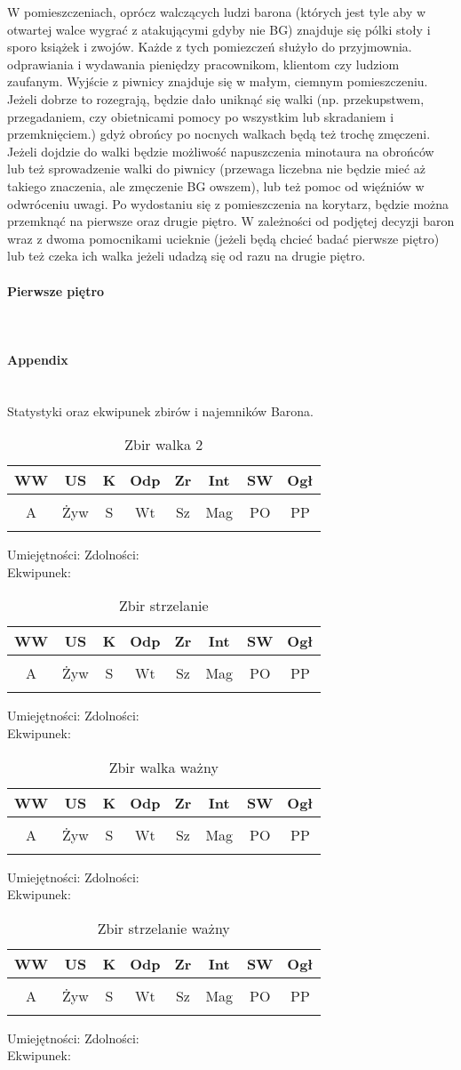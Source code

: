 \documentclass{article}
\newcommand{\whtable}[1]{
    \begin{table}[h]
        \caption{{#1}}
        \vspace{4pt}
        \centering
            \begin{tabular}{|c|c|c|c|c|c|c|c|}
                \hline
                WW & US & K & Odp & Zr & Int & SW & Ogł \\ \hline
                 &  &  &  &  &  &  &  \\ \hline
                A & Żyw & S & Wt & Sz & Mag & PO & PP \\ \hline
                 &  &  &  &  &  &  &  \\ \hline
                \end{tabular}
    \end{table}

    \noindent
    Umiejętności:
    \hspace{150pt}
    Zdolności:
    \vspace{50pt}\\
    Ekwipunek:
    \vspace{50pt}
}
\begin{document}
W pomieszczeniach, oprócz walczących ludzi barona (których jest tyle aby w otwartej walce wygrać z atakującymi gdyby nie BG) znajduje się pólki stoły i sporo książek i zwojów. Każde z tych pomiezczeń służyło do przyjmownia. odprawiania i wydawania pieniędzy pracownikom, klientom czy ludziom zaufanym. Wyjście z piwnicy znajduje się w małym, ciemnym pomieszczeniu. Jeżeli dobrze to rozegrają, będzie dało uniknąć się walki (np. przekupstwem, przegadaniem, czy obietnicami pomocy po wszystkim lub skradaniem i przemknięciem.) gdyż obrońcy po nocnych walkach będą też trochę zmęczeni. Jeżeli dojdzie do walki będzie możliwość napuszczenia minotaura na obrońców lub też sprowadzenie walki do piwnicy (przewaga liczebna nie będzie mieć aż takiego znaczenia, ale zmęczenie BG owszem), lub też pomoc od więźniów w odwróceniu uwagi. Po wydostaniu się z pomieszczenia na korytarz, będzie można przemknąć na pierwsze oraz drugie piętro. W zależności od podjętej decyzji baron wraz z dwoma pomocnikami ucieknie (jeżeli będą chcieć badać pierwsze piętro) lub też czeka ich walka jeżeli udadzą się od razu na drugie piętro. 

\paragraph{\Large{Pierwsze piętro}}\mbox{}\\



\pagebreak
\centering
\paragraph{\Large{Appendix}}\mbox{}\\
Statystyki oraz ekwipunek zbirów i najemników Barona.
\raggedright

\whtable{Zbir walka 2}

\whtable{Zbir strzelanie}

\whtable{Zbir walka ważny}

\whtable{Zbir strzelanie ważny}
\end{document}
